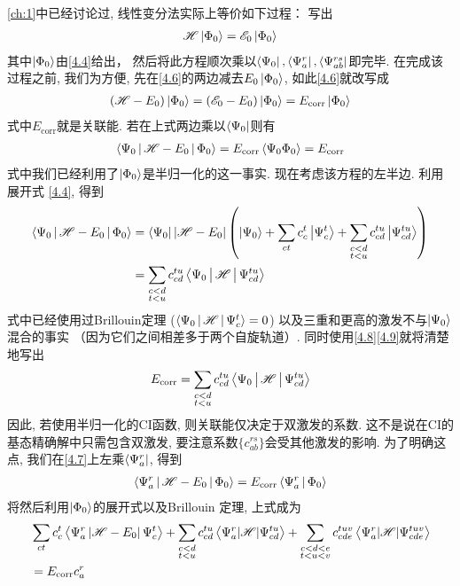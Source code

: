 \autoref*{ch:1}中已经讨论过, 线性变分法实际上等价如下过程： 写出
\begin{align}
\mathscr{H}\Ket{\Phi_0} = \mathscr{E}_0\Ket{\Phi_0}
\label{4.6}
\end{align}
其中$ \Ket{\Phi_0} $由\eqref{4.4}给出， 
然后将此方程顺次乘以$ \Bra{\Psi_0},\Bra{\Psi_a^r} ,\Bra{\Psi_{ab}^{rs}}$即完毕. 
在完成该过程之前, 
我们为方便, 
先在\eqref{4.6}的两边减去$ E_0\Ket{\Phi_0} $, 
如此\eqref{4.6}就改写成
\begin{align}
(\mathscr{H} -E_0)\Ket{\Phi_0} = (\mathscr{E}_0-E_0)\Ket{\Phi_0} = E_\mathrm{corr} \Ket{\Phi_0}
\label{4.7}
\end{align} 
式中$E_\mathrm{corr}$就是关联能. 
若在上式两边乘以$\Bra{\Psi_0}$则有
\begin{align}
\label{4.8}
\Braket{\Psi_0|\mathscr{H}-E_0|\Phi_0} = E_\mathrm{corr} \Braket{\Psi_0\Phi_0} = E_\mathrm{corr}
\end{align}
式中我们已经利用了$\Ket{\Phi_0}$是半归一化的这一事实. 
现在考虑该方程的左半边. 
利用展开式 \eqref{4.4}, 
得到
\begin{align}
\Braket{\Psi_0|\mathscr{H}-E_0|\Phi_0} & = \Bra{\Psi_0}|\mathscr{H}-E_0|\left( \Ket{\Psi_0} + \sum_{ct}c_c^t\Ket{\Psi_c^t} + \sum_{\substack{c<d\\t<u}} c_{cd}^{tu}\Ket{\Psi_{cd}^{tu}} \right)\notag \\
	&=\sum_{\substack{c<d\\t<u}}c_{cd}^{tu}\Braket{\Psi_0|\mathscr{H}|\Psi_{cd}^{tu}} \label{4.9}
\end{align}
式中已经使用过Brillouin定理 ($ \Braket{\Psi_0|\mathscr{H}|\Psi_c^t }=0$) 以及三重和更高的激发不与$\Ket{\Psi_0}$混合的事实 （因为它们之间相差多于两个自旋轨道）. 
同时使用\eqref{4.8}\eqref{4.9}就将清楚地写出
\begin{align}
E_\mathrm{corr} = \sum_{\substack{c<d\\t<u}}c_{cd}^{tu}\Braket{\Psi_0|\mathscr{H}|\Psi_{cd}^{tu}}
\end{align}
因此, 
若使用半归一化的CI函数, 
则关联能仅决定于双激发的系数. 
这不是说在CI的基态精确解中只需包含双激发, 
要注意系数$ \{c_{ab}^{rs}\} $会受其他激发的影响. 
为了明确这点, 
我们在\eqref{4.7}上左乘$ \Bra{\Psi_a^r} $, 
得到
\begin{align}
\Braket{\Psi_a^r|\mathscr{H}-E_0|\Phi_0} = E_\mathrm{corr} \Braket{\Psi_a^r|\Phi_0}
\label{4.10}
\end{align}
将然后利用$\Ket{\Phi_0}$的展开式以及Brillouin 定理, 
上式成为
\begin{align}
&\sum_{c t} c_{c}^{t}\left\langle\Psi_{a}^{r}\left|\mathscr{H}-E_{0}\right| \Psi_{c}^{t}\right\rangle+\sum_{\substack{c<d \\ t<u}} c_{cd}^{t u}\left\langle\Psi_{a}^{r}|\mathscr{H}| \Psi_{c d}^{t u}\right\rangle+\sum_{\substack{c<d<e\\ t<u<v}} c_{c d e}^{t u v}\left\langle\Psi_{a}^{r}|\mathscr{H}| \Psi_{c d e}^{t u v}\right\rangle \notag \\
&=E_{\mathrm{corr}} c_{a}^{r}
\label{4.11}
\end{align}

